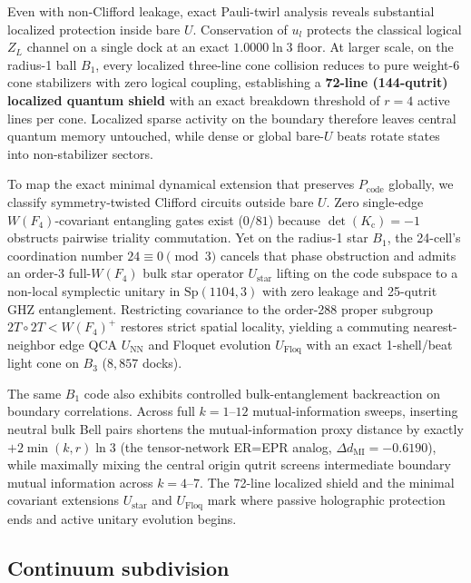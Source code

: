 Even with non-Clifford leakage, exact Pauli-twirl analysis reveals substantial localized protection inside bare $U$.
Conservation of $u_l$ protects the classical logical $Z_L$ channel on a single dock at an exact $1.0000\ln 3$ floor. At
larger scale, on the radius-1 ball $B_1$, every localized three-line cone collision reduces to pure weight-6 cone
stabilizers with zero logical coupling, establishing a \textbf{72-line (144-qutrit) localized quantum shield} with an
exact breakdown threshold of $r = 4$ active lines per cone. Localized sparse activity on the boundary therefore leaves
central quantum memory untouched, while dense or global bare-$U$ beats rotate states into non-stabilizer sectors.

To map the exact minimal dynamical extension that preserves $P_{\mathrm{code}}$ globally, we classify symmetry-twisted
Clifford circuits outside bare $U$. Zero single-edge $W(F_4)$-covariant entangling gates exist ($0/81$) because
$\det(K_{\mathrm{c}}) = -1$ obstructs pairwise triality commutation. Yet on the radius-1 star $B_1$, the 24-cell's
coordination number $24 \equiv 0 \pmod 3$ cancels that phase obstruction and admits an order-3 full-$W(F_4)$ bulk star
operator $U_{\mathrm{star}}$ lifting on the code subspace to a non-local symplectic unitary in $\mathrm{Sp}(1104, 3)$
with zero leakage and 25-qutrit GHZ entanglement. Restricting covariance to the order-288 proper subgroup
$2T \circ 2T < W(F_4)^+$ restores strict spatial locality, yielding a commuting nearest-neighbor edge QCA
$U_{\mathrm{NN}}$ and Floquet evolution $U_{\mathrm{Floq}}$ with an exact 1-shell/beat light cone on $B_3$ ($8{,}857$
docks).

The same $B_1$ code also exhibits controlled bulk-entanglement backreaction on boundary correlations. Across full
$k = 1\text{--}12$ mutual-information sweeps, inserting neutral bulk Bell pairs shortens the mutual-information proxy
distance by exactly $+2\min(k, r)\ln 3$ (the tensor-network ER=EPR analog, $\Delta d_{\mathrm{MI}} = -0.6190$), while
maximally mixing the central origin qutrit screens intermediate boundary mutual information across $k = 4\text{--}7$.
The 72-line localized shield and the minimal covariant extensions $U_{\mathrm{star}}$ and $U_{\mathrm{Floq}}$ mark where
passive holographic protection ends and active unitary evolution begins.

\subsection{Continuum subdivision}

